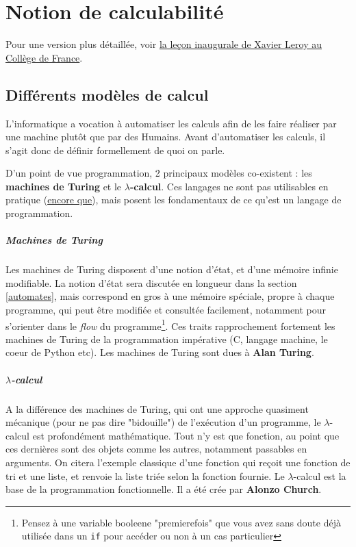 
\chapter{Notion de calculabilité}

Pour une version plus détaillée, voir \href{https://www.college-de-france.fr/site/xavier-leroy/inaugural-lecture-2018-11-15-18h00.htm}{la leçon inaugurale de Xavier Leroy au Collège de France}.

\section{Différents modèles de calcul}

L'informatique a vocation à automatiser les calculs afin de les faire réaliser par une machine plutôt que par des Humains. Avant d'automatiser les calculs, il s'agit donc de définir formellement de quoi on parle.

D'un point de vue programmation, 2 principaux modèles co-existent : les \textbf{machines de Turing} et le \textbf{$\lambda$-calcul}. Ces langages ne sont pas utilisables en pratique (\href{http://www.ens-lyon.fr/actualite/lecole/la-machine-de-turing-en-legos}{encore que}), mais posent les fondamentaux de ce qu'est un langage de programmation.

\paragraph{Machines de Turing} Les machines de Turing disposent d'une notion d'état, et d'une mémoire infinie modifiable. La notion d'état sera discutée en longueur dans la section \ref{automates}, mais correspond en gros à une mémoire spéciale, propre à chaque programme, qui peut être modifiée et consultée facilement, notamment pour s'orienter dans le \textit{flow} du programme\footnote{Pensez à une variable booleene "premierefois" que vous avez sans doute déjà utilisée dans un \texttt{if} pour accéder ou non à un cas particulier}. Ces traits rapprochement fortement les machines de Turing de la programmation impérative (C, langage machine, le coeur de Python etc). Les machines de Turing sont dues à \textbf{Alan Turing}.

\paragraph{$\lambda$-calcul} A la différence des machines de Turing, qui ont une approche quasiment mécanique (pour ne pas dire "bidouille") de l'exécution d'un programme, le $\lambda$-calcul est profondément mathématique. Tout n'y est que fonction, au point que ces dernières sont des objets comme les autres, notamment passables en arguments. On citera l'exemple classique d'une fonction qui reçoit une fonction de tri et une liste, et renvoie la liste triée selon la fonction fournie. Le $\lambda$-calcul est la base de la programmation fonctionnelle. Il a été crée par \textbf{Alonzo Church}.

